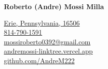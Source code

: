 \documentclass{../../Styles/AndreCV-RStyle}
\begin{document}
\begin{center}
    \textbf{\huge{Roberto (Andre) Mossi Milla}}\\

    \vspace{0.3cm}

    \small{
        \href{https://www.google.com/maps?q=42.127033,-80.088276}{Erie, Pennsylvania, 16506}\\
        \href{tel:+18147901591}{814-790-1591}\\
        \href{mailto:mossiroberto0392@gmail.com}{mossiroberto0392@gmail.com}\\
        \href{https://andremossi-linktree.vercel.app/}{andremossi-linktree.vercel.app}\\
		\href{https://github.com/AndreM222}{github.com/AndreM222}
    }
    \vspace{0.5cm}
\end{center}
\end{document}
